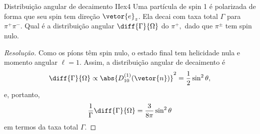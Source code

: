 \begin{exercício}{Distribuição angular de decaimento II}{ex4}
   Uma partícula de spin 1 é polarizada de forma que seu spin tem direção \(\vetor{e}_z\). Ela decai com taxa total \(\Gamma\) para \(\pi^+\pi^-.\) Qual é a distribuição angular \(\diff{\Gamma}{\Omega}\) do \(\pi^+,\) dado que \(\pi^\pm\) tem spin nulo.
\end{exercício}
\begin{proof}[Resolução]
   Como os píons têm spin nulo, o estado final tem helicidade nula e momento angular \(\ell = 1.\) Assim, a distribuição angular de decaimento é
   \begin{equation*}
      \diff{\Gamma}{\Omega} \propto \abs{D^{(1)}_{10}(\vetor{n})}^2 = \frac12 \sin^2\theta,
   \end{equation*}
   e, portanto,
   \begin{equation*}
      \frac1\Gamma \diff{\Gamma}{\Omega} = \frac{3}{8\pi}\sin^2\theta
   \end{equation*}
   em termos da taxa total \(\Gamma.\)
\end{proof}
